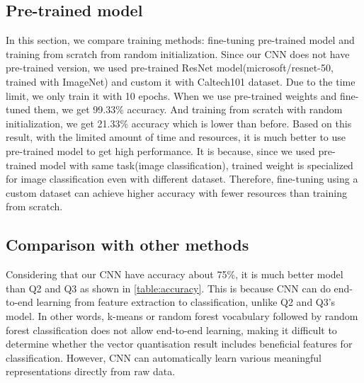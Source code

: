 \subsection{Pre-trained model}
In this section, we compare training methods: fine-tuning pre-trained model and training from scratch from random initialization. Since our CNN does not have pre-trained version, we used pre-trained ResNet model(microsoft/resnet-50, trained with ImageNet) and custom it with Caltech101 dataset. Due to the time limit, we only train it with 10 epochs. When we use pre-trained weights and fine-tuned them, we get 99.33\% accuracy. And training from scratch with random initialization, we get 21.33\% accuracy which is lower than before. Based on this result, with the limited amount of time and resources, it is much better to use pre-trained model to get high performance. It is because, since we used pre-trained model with same task(image classification), trained weight is specialized for image classification even with different dataset. Therefore, fine-tuning using a custom dataset can achieve higher accuracy with fewer resources than training from scratch.

\subsection{Comparison with other methods}
Considering that our CNN have accuracy about 75\%, it is much better model than Q2 and Q3 as shown in \cref{table:accuracy}. This is because CNN can do end-to-end learning from feature extraction to classification, unlike Q2 and Q3's model. In other words, k-means or random forest vocabulary followed by random forest classification does not allow end-to-end learning, making it difficult to determine whether the vector quantisation result includes beneficial features for classification. However, CNN can automatically learn various meaningful representations directly from raw data.

\begin{table}[htbp]
	\centering
	\setlength{\tabcolsep}{6pt} %
	\renewcommand{\arraystretch}{1.5} %
	\caption{Accuracy of Models}
	\label{table:accuracy}
\end{table}